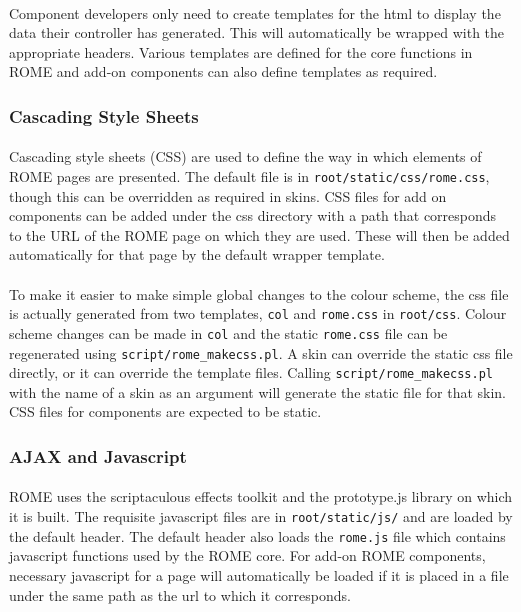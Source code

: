 \paragraph{} 
Component developers only need to create templates for the html to display the data their controller has generated. This will automatically be wrapped with the appropriate headers. Various templates are defined for the core functions in ROME and add-on components can also define templates as required. 

\subsubsection{Cascading Style Sheets}
\label{sec:view_css}

\paragraph{}
Cascading style sheets (CSS) are used to define the way in which elements of ROME pages are presented. The default file is in \texttt{root/static/css/rome.css}, though this can be overridden as required in skins. CSS files for add on components can be added under the css directory with a path that corresponds to the URL of the ROME page on which they are used. These will then be added automatically for that page by the default wrapper template.

\paragraph{}
To make it easier to make simple global changes to the colour scheme, the css file is actually generated from two templates, \texttt{col} and \texttt{rome.css} in \texttt{root/css}. Colour scheme changes can be made in \texttt{col} and the static \texttt{rome.css} file can be regenerated using \texttt{script/rome\_makecss.pl}. A skin can override the static css file directly, or it can override the template files. Calling \texttt{script/rome\_makecss.pl} with the name of a skin as an argument will generate the static file for that skin. CSS files for components are expected to be static. 


\subsubsection{AJAX and Javascript}
\label{sec:view_javascript}

\paragraph{}
ROME uses the scriptaculous effects toolkit and the prototype.js library on which it is built. The requisite javascript files are in \texttt{root/static/js/} and are loaded by the default header. The default header also loads the \texttt{rome.js} file which contains javascript functions used by the ROME core. For add-on ROME components, necessary javascript for a page will automatically be loaded if it is placed in a file under the same path as the url to which it corresponds. 

